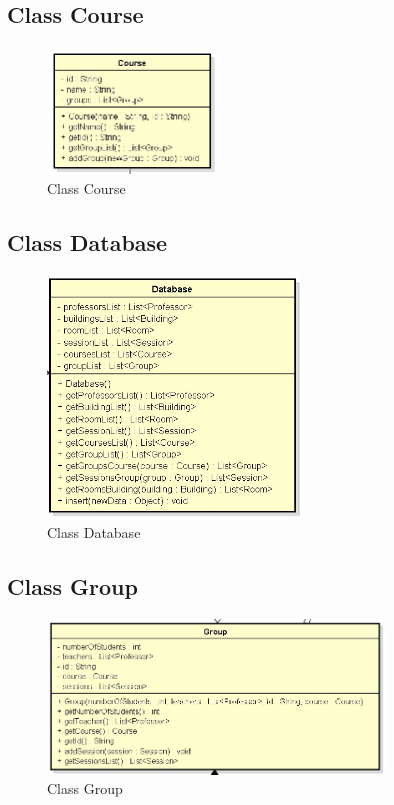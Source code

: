 \documentclass[a4paper]{article}
\begin{document}
\subsection{Class Course}
\begin{figure}[H]
\centering
\includegraphics[width=0.4\textwidth]{Course.jpg}
\caption{\label{fig:course}Class Course}
\end{figure}


\subsection{Class Database}
\begin{figure}[H]
\centering
\includegraphics[width=0.6\textwidth]{Database.jpg}
\caption{\label{fig:database}Class Database}
\end{figure}


\subsection{Class Group}
\begin{figure}[H]
\centering
\includegraphics[width=0.8\textwidth]{Group.jpg}
\caption{\label{fig:group}Class Group}
\end{figure}
\end{document}
